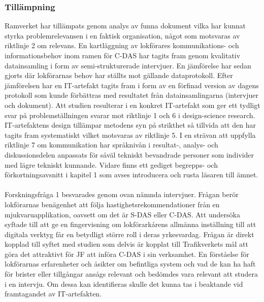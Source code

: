 \subsubsection{Tillämpning}
Ramverket har tillämpats genom analys av funna dokument vilka har kunnat styrka problemrelevansen i en faktisk organisation, något som motsvaras av riktlinje 2 om relevans.
En kartläggning av lokförares kommunikations- och informationsbehov inom ramen för C-DAS har tagits fram genom kvalitativ datainsamling i form av semi-strukturerade intervjuer.
En jämförelse har sedan gjorts där lokförarnas behov har ställts mot gällande dataprotokoll.
Efter jämförelsen har en IT-artefakt tagits fram i form av en förfinad version av dagens protokoll som kunde förbättras med resultatet från datainsamlingarna (intervjuer och dokument).
Att studien resulterar i en konkret IT-artefakt som ger ett tydligt svar på problemställningen svarar mot riktlinje 1 och 6 i design-science research.
IT-artefaktens design tillämpar metodens syn på strikthet så tillvida att den har tagits fram systematiskt vilket motsvaras av riktlinje 5.
I en strävan att uppfylla riktlinje 7 om kommunikation har språknivån i resultat-, analys- och diskussionsdelen anpassats för såväl tekniskt bevandrade personer som individer med lägre tekniskt kunnande.
Vidare finns ett gediget begrepps- och förkortningsavsnitt i kapitel 1 som avses introducera och rusta läsaren till ämnet.
\paragraph{}
\hspace{-11pt}Forskningsfråga 1 besvarades genom ovan nämnda intervjuer. 
Frågan berör lokförarnas benägenhet att följa hastighetsrekommendationer från en mjukvaruapplikation, oavsett om det är S-DAS eller C-DAS\@.
Att undersöka syftade till att ge en fingervisning om lokförarkårens allmänna inställning till att digitala verktyg får en betydligt större roll i deras yrkesvardag.
Frågan är direkt kopplad till syftet med studien som delvis är kopplat till Trafikverkets mål att göra det attraktivt för JF att införa C-DAS i sin verksamhet.
En förståelse för lokförarnas erfarenheter och åsikter om befintliga system och vad de kan ha haft för brister eller tillgångar ansågs relevant och bedömdes vara relevant att studera i en intervju.
Om dessa kan identifieras skulle det kunna tas i beaktande vid framtagandet av IT-artefakten. 
